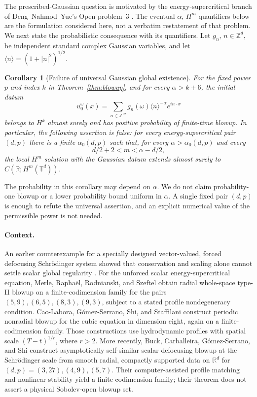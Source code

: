 \documentclass[11pt]{article}
\numberwithin{equation}{section}
\newtheorem{corollary}[theorem]{Corollary}
\theoremstyle{definition}
\theoremstyle{remark}
\begin{document}
The prescribed-Gaussian question is motivated by the energy-supercritical
branch of Deng--Nahmod--Yue's Open problem~3
\cite[Section~9.2.3, p.~98]{DengNahmodYue2020}.
The eventual-$\alpha$, $H^m$ quantifiers below are the formulation
considered here, not a verbatim restatement of that problem.
We next state the probabilistic consequence with its quantifiers.
Let $g_n$, $n\in\mathbb Z^d$, be independent standard complex Gaussian
variables, and let $\langle n\rangle=(1+|n|^2)^{1/2}$.

\begin{corollary}[Failure of universal Gaussian global existence]
\label{cor:gaussian}
For the fixed power $p$ and index $k$ in Theorem~\ref{thm:blowup}, and
for every $\alpha>k+6$, the initial datum
\begin{equation}\label{eq:gaussian}
 u_0^\omega(x)=\sum_{n\in\mathbb Z^{12}}
       g_n(\omega)\langle n\rangle^{-\alpha}e^{in\cdot x}
\end{equation}
belongs to $H^k$ almost surely and has positive probability of finite-time
blowup. In particular, the following assertion is false: for every
energy-supercritical pair $(d,p)$ there is a finite $\alpha_0(d,p)$
such that, for every $\alpha>\alpha_0(d,p)$ and every
\[
 d/2+2<m<\alpha-d/2,
\]
the local $H^m$ solution with the Gaussian datum extends almost surely
to $C(\mathbb R;H^m(\mathbb T^d))$.
\end{corollary}

The probability in this corollary may depend on $\alpha$. We do not
claim probability-one blowup or a lower probability bound uniform in
$\alpha$. A single fixed pair $(d,p)$ is enough to refute the universal
assertion, and an explicit numerical value of the permissible power is
not needed.

\paragraph{Context.}
An earlier counterexample for a specially designed vector-valued,
forced defocusing Schr\"odinger system showed that conservation and
scaling alone cannot settle scalar global regularity
\cite[Theorem~1.2]{Tao2018}. For the unforced scalar energy-supercritical equation,
Merle, Rapha\"el, Rodnianski, and Szeftel
\cite[Theorem~1.1]{MRRS2022} obtain radial whole-space type-II blowup
on a finite-codimension family for the pairs
$(5,9),(6,5),(8,3),(9,3)$, subject to a stated profile nondegeneracy
condition. Cao-Labora, G\'omez-Serrano, Shi, and Staffilani
\cite[Theorem~1.1]{CLGSS2024} construct periodic nonradial blowup for
the cubic equation in dimension eight, again on a finite-codimension
family. Those constructions use hydrodynamic profiles with spatial
scale $(T-t)^{1/r}$, where $r>2$.
More recently, Buck, Carballeira, G\'omez-Serrano, and Shi
\cite[Theorem~1.1 and Section~4.3]{BuckEtAl2026} construct asymptotically self-similar
scalar defocusing blowup at the Schr\"odinger scale from smooth radial,
compactly supported data on $\mathbb R^d$ for
$(d,p)=(3,27),(4,9),(5,7)$. Their computer-assisted profile matching
and nonlinear stability yield a finite-codimension family; their
theorem does not assert a physical Sobolev-open blowup set.
\end{document}
